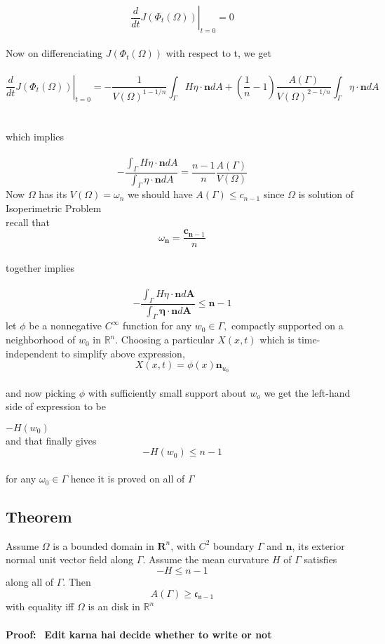 \documentclass[oneside]{book}
\begin{document}
$$\left.\frac{d}{d t} J\left(\Phi_{t}(\Omega)\right)\right|_{t=0} = 0 $$ \\ 
Now on differenciating $J(\Phi_{t}(\Omega))$ with respect to t,
we get \\\\
$$\left.\frac{d}{d t} J\left(\Phi_{t}(\Omega)\right)\right|_{t=0} =  -\frac{1}{V(\Omega)^{1-1 / n}} \int_{\Gamma} H \eta \cdot \mathbf{n} d A+\left(\frac{1}{n}-1\right) \frac{A(\Gamma)}{V(\Omega)^{2-1 / n}} \int_{\Gamma} \eta \cdot \mathbf{n} d A 
$$ \\\\
which implies \\\\
$$
-\frac{\int_{\Gamma} H \eta \cdot \mathbf{n} d A}{\int_{\Gamma} \eta \cdot \mathbf{n} d A}=\frac{n-1}{n} \frac{A(\Gamma)}{V(\Omega)}
$$
Now $\Omega$ has its $V(\Omega) = \omega_{n}$ we should have $A(\Gamma) \leq c_{n-1}$ since $\Omega $ is solution of Isoperimetric Problem \\
 recall that \\ $$ \omega_{\mathbf{n}}=\frac{\mathbf{c}_{\mathbf{n}-1}}{n}$$ \\
 together  implies \\\\
 \begin{equation}
 -\frac{\int_{\Gamma} H \eta \cdot \mathbf{n} d \boldsymbol{A}}{\int_{\Gamma} \boldsymbol{\eta} \cdot \mathbf{n} d \boldsymbol{A}} \leq \boldsymbol{n}-1 
 \end{equation}
 let $\phi$ be a nonnegative $C^{\infty}$ function for any $w_{0} \in \Gamma,$ compactly supported on a neighborhood of $w_{0}$ in $\mathbb{R}^{n}$.
 Choosing a particular $X(x, t)$ which is time-independent to  simplify above expression, \\
$$
X(x, t)=\phi(x) \mathbf{n}_{u_{0}}
$$
\\
and now picking $\phi$ with sufficiently small support about $w_{o}$ we get the left-hand side of expression to be 

$ -H\left(w_{0}\right )$ \\

  and that finally gives
  \\
   $$ -H(w_{0})\leq n-1 $$ \\
    for any $ \omega_{0} \in \Gamma$ hence it is proved on all of $\Gamma$ 






\subsection{Theorem}
Assume $\Omega$ is a bounded domain in $\mathbf{R}^{n}$, with $C^{2}$ boundary $\Gamma$
and $\mathbf{n}$, its exterior normal unit vector field along $\Gamma$. Assume the mean curvature
$H$ of $\Gamma$ satisfies
$$
-H \leq n-1
$$
along all of $\Gamma$. Then
$$
A(\Gamma) \geq \mathfrak{c}_{\mathfrak{n}-1}
$$
with equality iff $\Omega$ is an disk in $\mathbb{R}^{n}$ \\\\
\textbf{Proof:} \ \textbf{Edit karna hai decide whether to write or not }\\
\end{document}
